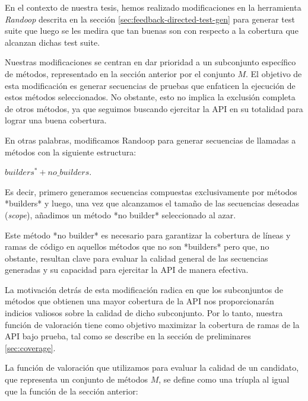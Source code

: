 

En el contexto de nuestra tesis, hemos realizado modificaciones en la herramienta \emph{Randoop} descrita en la sección \ref{sec:feedback-directed-test-gen} para generar test suite que luego se les medira que tan buenas son con respecto a la cobertura que alcanzan dichas test suite.

Nuestras modificaciones se centran en dar prioridad a un subconjunto específico de métodos, representado en la sección anterior por el conjunto $M$. El objetivo de esta modificación es generar secuencias de pruebas que enfaticen la ejecución de estos métodos seleccionados. No obstante, esto no implica la exclusión completa de otros métodos, ya que seguimos buscando ejercitar la API en su totalidad para lograr una buena cobertura.

En otras palabras, modificamos Randoop para generar secuencias de llamadas a métodos con la siguiente estructura: 
\vspace{10pt} 

$builders^* + no\_builders$. 

Es decir, primero generamos secuencias compuestas exclusivamente por métodos *builders* y luego, una vez que alcanzamos el tamaño de las secuencias deseadas (\emph{scope}), 
añadimos un método *no builder* seleccionado al azar.  

Este método *no builder* es necesario para garantizar la cobertura de líneas y ramas de código en aquellos métodos que no son *builders* pero que, no obstante, resultan clave para evaluar la calidad general de las secuencias generadas y su capacidad para ejercitar la API de manera efectiva.  

La motivación detrás de esta modificación radica en que los subconjuntos de métodos que obtienen una mayor cobertura de la API nos proporcionarán indicios valiosos sobre la calidad de dicho subconjunto. Por lo tanto, nuestra función de valoración tiene como objetivo maximizar la cobertura de ramas de la API bajo prueba, tal como se describe en la sección de preliminares \ref{sec:coverage}.

La función de valoración que utilizamos para evaluar la calidad de un candidato, que representa un conjunto de métodos $M$, se define como una tríupla al igual que la función de la sección anterior:

